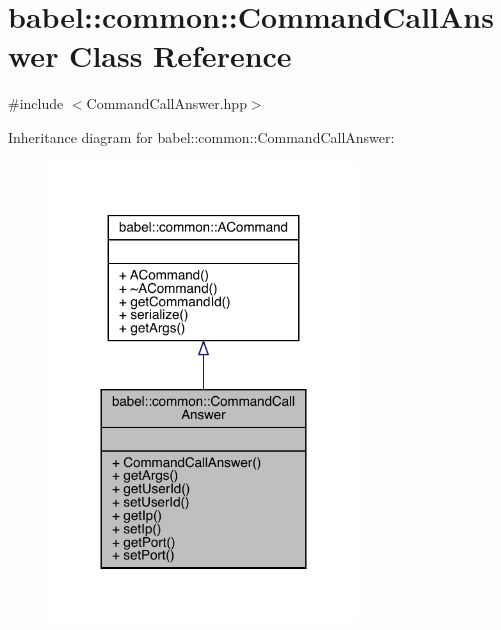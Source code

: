 \hypertarget{classbabel_1_1common_1_1_command_call_answer}{}\section{babel\+:\+:common\+:\+:Command\+Call\+Answer Class Reference}
\label{classbabel_1_1common_1_1_command_call_answer}


{\ttfamily \#include $<$Command\+Call\+Answer.\+hpp$>$}



Inheritance diagram for babel\+:\+:common\+:\+:Command\+Call\+Answer\+:\nopagebreak
\begin{figure}[H]
\begin{center}
\leavevmode
\includegraphics[width=233pt]{classbabel_1_1common_1_1_command_call_answer__inherit__graph}
\end{center}
\end{figure}


